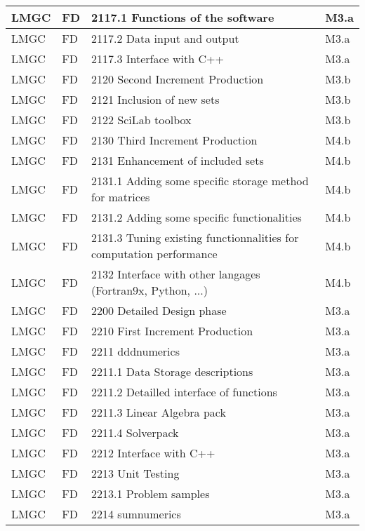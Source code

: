 \begin{longtable}{|l|l|l|l|}
  LMGC & FD &   2117.1 Functions of the software & M3.a \\ \hline
  LMGC & FD &   2117.2 Data input and output    & M3.a \\ \hline
  LMGC & FD &   2117.3 Interface with C++               & M3.a \\ \hline
  LMGC & FD &   2120 Second Increment Production        & M3.b \\ \hline
  LMGC & FD &   2121 Inclusion of new sets              & M3.b \\ \hline
  LMGC & FD &   2122 SciLab toolbox			            & M3.b \\ \hline
  LMGC & FD &   2130 Third Increment Production         & M4.b \\ \hline
  LMGC & FD &   2131 Enhancement of included sets       & M4.b \\ \hline
  LMGC & FD &   2131.1 Adding some specific storage method for matrices & M4.b \\ \hline
  LMGC & FD &   2131.2 Adding some specific functionalities                         & M4.b \\ \hline
  LMGC & FD &   2131.3 Tuning existing functionnalities for computation performance & M4.b \\ \hline
  LMGC & FD &   2132 Interface with other langages (Fortran9x, Python, ...)     & M4.b \\ \hline
  LMGC & FD &   2200 Detailed Design phase              & M3.a \\ \hline
  LMGC & FD &   2210 First Increment Production         & M3.a \\ \hline
  LMGC & FD &   2211 \ac{dddnumerics}                   & M3.a \\ \hline
  LMGC & FD &   2211.1 Data Storage descriptions        & M3.a \\ \hline
  LMGC & FD &   2211.2 Detailled interface of functions & M3.a \\ \hline
  LMGC & FD &   2211.3 Linear Algebra pack              & M3.a \\ \hline
  LMGC & FD &   2211.4 Solverpack                       & M3.a \\ \hline
  LMGC & FD &   2212 Interface with C++                 & M3.a \\ \hline
  LMGC & FD &   2213 Unit Testing                       & M3.a \\ \hline
  LMGC & FD &   2213.1 Problem samples          & M3.a \\ \hline
  LMGC & FD &   2214 \ac{sumnumerics}           & M3.a \\ \hline

\end{longtable}
